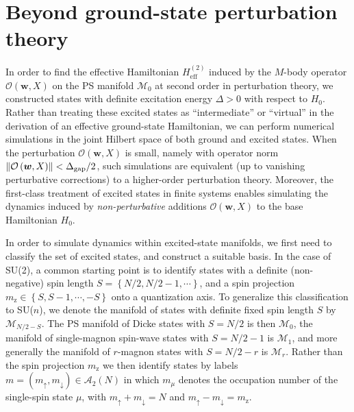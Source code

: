 \documentclass[nofootinbib,notitlepage,11pt]{revtex4-2}
\renewcommand{\t}{\text} %
\newcommand{\p}[1]{\left(#1\right)} %
\renewcommand{\set}[1]{\left\{#1\right\}} %
\newcommand{\m}{\bm} %
\newcommand{\1}{\mathds{1}}
\newcommand{\up}{\uparrow}
\newcommand{\dn}{\downarrow}
\newcommand{\z}{\text{z}}
\newcommand{\A}{\mathcal{A}}
\newcommand{\M}{\mathcal{M}}
\renewcommand{\O}{\mathcal{O}}
\begin{document}
\section{Beyond ground-state perturbation theory}
\label{sec:shell_model}

In order to find the effective Hamiltonian $H_{\t{eff}}^{(2)}$ induced
by the $M$-body operator $\O\p{\m w,X}$ on the PS manifold $\M_0$ at
second order in perturbation theory, we constructed states with
definite excitation energy $\Delta>0$ with respect to $H_0$.  Rather
than treating these excited states as ``intermediate'' or ``virtual''
in the derivation of an effective ground-state Hamiltonian, we can
perform numerical simulations in the joint Hilbert space of both
ground and excited states.  When the perturbation $\O\p{\m w,X}$ is
small, namely with operator norm
$\norm{\O\p{\m w,X}}<\Delta_{\t{gap}}/2$, such simulations are
equivalent (up to vanishing perturbative corrections) to a
higher-order perturbation theory.  Moreover, the first-class treatment
of excited states in finite systems enables simulating the dynamics
induced by {\it non-perturbative} additions $\O\p{\m w,X}$ to the base
Hamiltonian $H_0$.

In order to simulate dynamics within excited-state manifolds, we first
need to classify the set of excited states, and construct a suitable
basis.  In the case of SU(2), a common starting point is to identify
states with a definite (non-negative) spin length
$S=\set{N/2,N/2-1,\cdots}$, and a spin projection
$m_\z\in\set{S,S-1,\cdots,-S}$ onto a quantization axis.  To
generalize this classification to SU($n$), we denote the manifold of
states with definite fixed spin length $S$ by $\M_{N/2-S}$.  The PS
manifold of Dicke states with $S=N/2$ is then $\M_0$, the manifold of
single-magnon spin-wave states with $S=N/2-1$ is $\M_1$, and more
generally the manifold of $r$-magnon states with $S=N/2-r$ is $\M_r$.
Rather than the spin projection $m_\z$ we then identify states by
labels $m=\p{m_\up,m_\dn}\in\A_2\p{N}$ in which $m_\mu$ denotes the
occupation number of the single-spin state $\mu$, with
$m_\up+m_\dn=N$ and $m_\up-m_\dn=m_\z$.
\end{document}
